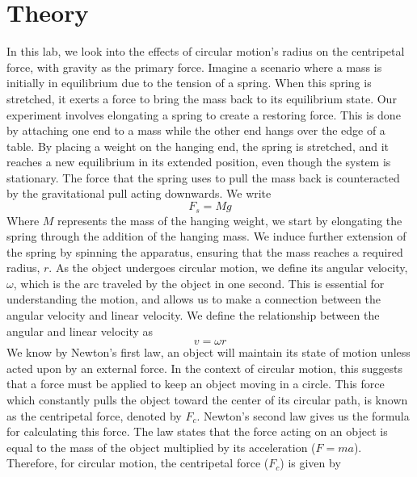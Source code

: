 \documentclass{report}
\begin{document}
    \bigbreak \noindent 
    \section{Theory}
    \bigbreak \noindent 
    In this lab, we look into the effects of circular motion's radius on the centripetal force, with gravity as the primary force. Imagine a scenario where a mass is initially in equilibrium due to the tension of a spring. When this spring is stretched, it exerts a force to bring the mass back to its equilibrium state. Our experiment involves elongating a spring to create a restoring force. This is done by attaching one end to a mass while the other end hangs over the edge of a table. By placing a weight on the hanging end, the spring is stretched, and it reaches a new equilibrium in its extended position, even though the system is stationary. The force that the spring uses to pull the mass back is counteracted by the gravitational pull acting downwards. We write
    \begin{equation}
        F_{s} = Mg
    \end{equation}
    \bigbreak \noindent 
    Where \(M\) represents the mass of the hanging weight, we start by elongating the spring through the addition of the hanging mass. We induce further extension of the spring by spinning the apparatus, ensuring that the mass reaches a required radius, $r$.
    \bigbreak \noindent 
    As the object undergoes circular motion, we define its angular velocity, \(\omega\), which is the arc traveled by the object in one second. This is essential for understanding the motion, and allows us to make a connection between the angular velocity and linear velocity. We define the relationship between the angular and linear velocity as 
    \begin{equation}
        v = \omega r
    \end{equation}
    \bigbreak \noindent 
    We know by Newton's first law, an object will maintain its state of motion unless acted upon by an external force. In the context of circular motion, this suggests that a force must be applied to keep an object moving in a circle. This force which constantly pulls the object toward the center of its circular path, is known as the centripetal force, denoted by \( F_c \). Newton's second law gives us the formula for calculating this force. The law states that the force acting on an object is equal to the mass of the object multiplied by its acceleration (\( F = ma \)). Therefore, for circular motion, the centripetal force (\( F_c \)) is given by
\end{document}
